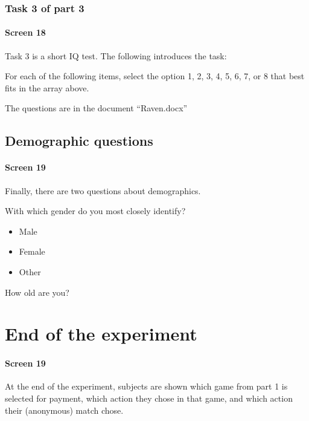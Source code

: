 \documentclass[11pt]{article}
\begin{document}
\subsubsection{Task 3 of part 3}


\paragraph{Screen 18} Task 3 is a short IQ test. The following introduces the task:

\begin{tcolorbox}
For each of the following items, select the option 1, 2, 3, 4, 5, 6, 7, or 8 that best fits in the array above.
\end{tcolorbox}

The questions are in the document ``Raven.docx''

\subsection{Demographic questions}

\paragraph{Screen 19} Finally, there are two questions about demographics.

\begin{tcolorbox}
With which gender do you most closely identify?
\begin{itemize}
\item	Male
\item	Female
\item Other
\end{itemize}

How old are you?
\end{tcolorbox}



\section{End of the experiment}

\paragraph{Screen 19} At the end of the experiment, subjects are shown which game from part 1 is selected for payment, which action they chose in that game, and which action their (anonymous) match chose. 
\end{document}
